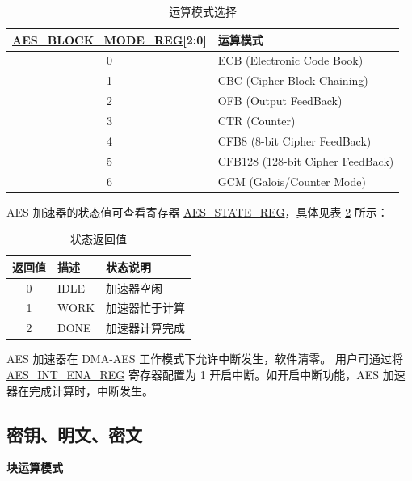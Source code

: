 \documentclass[main\_\_CN.tex]{subfiles}
\begin{document}
\begin{longtable}[c]{ | c | l | }
\caption{运算模式选择}
\label{table:AESBlockMode}
\\\hline
\rowcolor{lightgray}
\hyperref[regdesc:AESBLOCKMODEREG]{AES\_BLOCK\_MODE\_REG}[2:0]     & 运算模式\\
    \hline
    0                          & ECB (Electronic Code Book)    \\
    \hline
    1                          & CBC (Cipher Block Chaining)     \\
    \hline
    2                          & OFB (Output FeedBack)    \\
    \hline
    3                          & CTR (Counter)    \\
    \hline
    4                          & CFB8 (8-bit Cipher FeedBack)    \\
    \hline
    5                          & CFB128 (128-bit Cipher FeedBack) \\
    \hline
    6                          & GCM (Galois/Counter Mode)     \\
    \hline
\end{longtable}

AES 加速器的状态值可查看寄存器 \hyperref[regdesc:AESSTATEREG]{AES\_STATE\_REG}，具体见表 \ref{table:AESStateValue-dma} 所示：

\begin{longtable}[c]{ | c | l | l | }
\caption{状态返回值}
\label{table:AESStateValue-dma}
\\\hline
\rowcolor{lightgray}
返回值 & 描述 &  状态说明 \\ \hline

    0                   & IDLE      &   加速器空闲\\ \hline
    1                   & WORK      &   加速器忙于计算     \\ \hline
    2                   & DONE      &   加速器计算完成     \\ \hline
\end{longtable}

AES 加速器在 DMA-AES 工作模式下允许中断发生，软件清零。
用户可通过将 \hyperref[regdesc:AESINTENAREG]{AES\_INT\_ENA\_REG} 寄存器配置为 1 开启中断。如开启中断功能，AES 加速器在完成计算时，中断发生。

\subsection{密钥、明文、密文}

\textbf{块运算模式}
\end{document}
